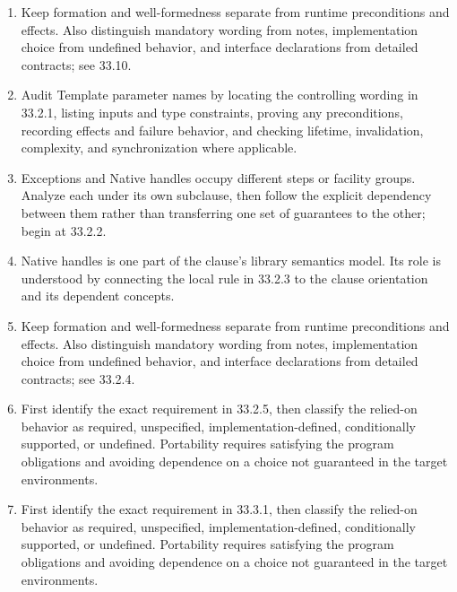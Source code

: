\documentclass[11pt,letterpaper]{article}
\begin{document}
\begin{enumerate}
\item Keep formation and well-formedness separate from runtime preconditions and effects. Also distinguish mandatory wording from notes, implementation choice from undefined behavior, and interface declarations from detailed contracts; see 33.10.
\item Audit Template parameter names by locating the controlling wording in 33.2.1, listing inputs and type constraints, proving any preconditions, recording effects and failure behavior, and checking lifetime, invalidation, complexity, and synchronization where applicable.
\item Exceptions and Native handles occupy different steps or facility groups. Analyze each under its own subclause, then follow the explicit dependency between them rather than transferring one set of guarantees to the other; begin at 33.2.2.
\item Native handles is one part of the clause's library semantics model. Its role is understood by connecting the local rule in 33.2.3 to the clause orientation and its dependent concepts.
\item Keep formation and well-formedness separate from runtime preconditions and effects. Also distinguish mandatory wording from notes, implementation choice from undefined behavior, and interface declarations from detailed contracts; see 33.2.4.
\item First identify the exact requirement in 33.2.5, then classify the relied-on behavior as required, unspecified, implementation-defined, conditionally supported, or undefined. Portability requires satisfying the program obligations and avoiding dependence on a choice not guaranteed in the target environments.
\item First identify the exact requirement in 33.3.1, then classify the relied-on behavior as required, unspecified, implementation-defined, conditionally supported, or undefined. Portability requires satisfying the program obligations and avoiding dependence on a choice not guaranteed in the target environments.
\end{enumerate}
\end{document}
